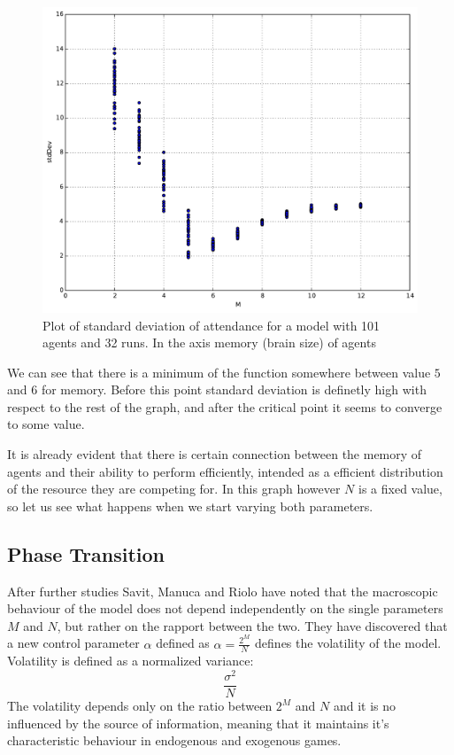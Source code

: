 \begin{figure}
\begin{center}
\includegraphics[scale=0.4]{images/minority/memory_to_stddev.pdf}
\caption{Plot of standard deviation of attendance for a model with 101 agents and 32 runs. In the axis memory (brain size) of agents}
\label{fig:memory to stddev}
\end{center}
\end{figure}

We can see that there is a minimum of the function somewhere between value $5$ and $6$ for memory.
Before this point standard deviation is definetly high with respect to the rest of the graph, and after the critical point it seems to converge to some value.

It is already evident that there is certain connection between the memory of agents and their ability to perform efficiently, intended as a efficient distribution of the resource they are competing for.
In this graph however $N$ is a fixed value, so let us see what happens when we start varying both parameters. 

\subsection{Phase Transition}
\label{subsec:phasetransition}

After further studies Savit, Manuca and Riolo \cite{savit1999adaptive} have noted that the macroscopic behaviour of the model does not depend independently on the single parameters $M$ and $N$, but rather on the rapport between the two.
They have discovered that a new control parameter $\alpha$ defined as $\alpha=\frac{2^M}{N}$ defines the volatility of the model.
Volatility is defined as a normalized variance:
\begin{displaymath}
\frac{\sigma^2}{N}
\end{displaymath}
The volatility depends only on the ratio between $2^M$ and $N$ and it is no influenced by the source of information, meaning that it maintains it's characteristic behaviour in endogenous and exogenous games.

